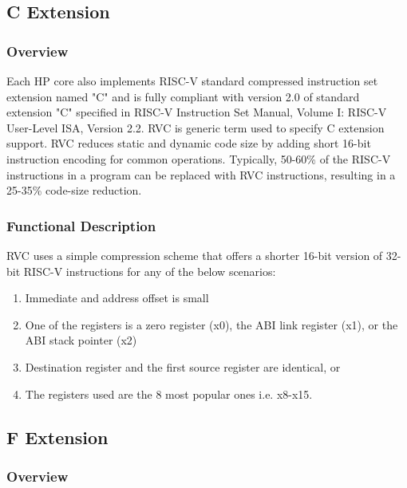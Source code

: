 \documentclass[main\_\_EN.tex]{subfiles}
\begin{document}
\subsection{C Extension}
\label{sec:riscvcpu-cext}

\subsubsection{Overview}
\label{sec:riscvcpu-cext-overview}

Each HP core also implements RISC-V standard compressed instruction set extension named "C" and is fully compliant with version 2.0 of standard extension "C" specified in RISC-V Instruction Set Manual, Volume I: RISC-V User-Level ISA, Version 2.2. RVC is generic term used to specify C extension support. RVC reduces static and dynamic code size by adding short 16-bit instruction encoding for common operations. Typically, 50-60\% of the RISC-V instructions in a program can be replaced with RVC instructions, resulting in a 25-35\% code-size reduction.

\subsubsection{Functional Description}
\label{sec:riscvcpu-cext-func-descr}
RVC uses a simple compression scheme that offers a shorter 16-bit version of 32-bit RISC-V instructions for any of the below scenarios:
\begin{enumerate}
    \item Immediate and address offset is small
    \item One of the registers is a zero register (x0), the ABI link register (x1), or the ABI stack pointer (x2)
    \item Destination register and the first source register are identical, or
    \item The registers used are the 8 most popular ones i.e. x8-x15.
\end{enumerate}

\newpage

\subsection{F Extension}
\label{sec:riscvcpu-fpu}

\subsubsection{Overview}
\label{sec:riscvcpu-fpu-overview}
\end{document}
